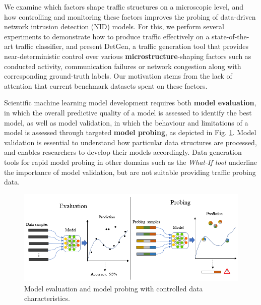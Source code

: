 \documentclass[runningheads]{llncs}
\begin{document}
We examine which factors shape traffic structures on a microscopic level, and how controlling and monitoring these factors improves the probing of data-driven network intrusion detection (NID) models. For this, we perform several experiments to demonstrate how to produce traffic effectively on a state-of-the-art traffic classifier, and present DetGen, a traffic generation tool that {provides near-deterministic} control over various \textbf{microstructure}-shaping factors such as conducted activity, communication failures or network congestion along with corresponding ground-truth labels. Our motivation stems from the lack of attention that current benchmark datasets spent on these factors.



Scientific machine learning model development requires both \textbf{model evaluation}, in which the overall predictive quality of a model is assessed to identify the best model, as well as model validation, in which the behaviour and limitations of a model is assessed through targeted \textbf{model probing}, as depicted in Fig. \ref{Fig:Prob}. Model validation is essential to understand how particular data structures are processed, and enables researchers to develop their models accordingly. Data generation tools for rapid model probing in other domains such as the \textit{What-If tool} \cite{wexler2019if} underline the importance of model validation, but are not suitable providing traffic probing data.

\begin{figure}
\centering
\includegraphics[width=\textwidth]{images/Eva_Prob.png}
\caption{Model evaluation and model probing with controlled data characteristics.}\label{Fig:Prob}
\end{figure}
\end{document}
